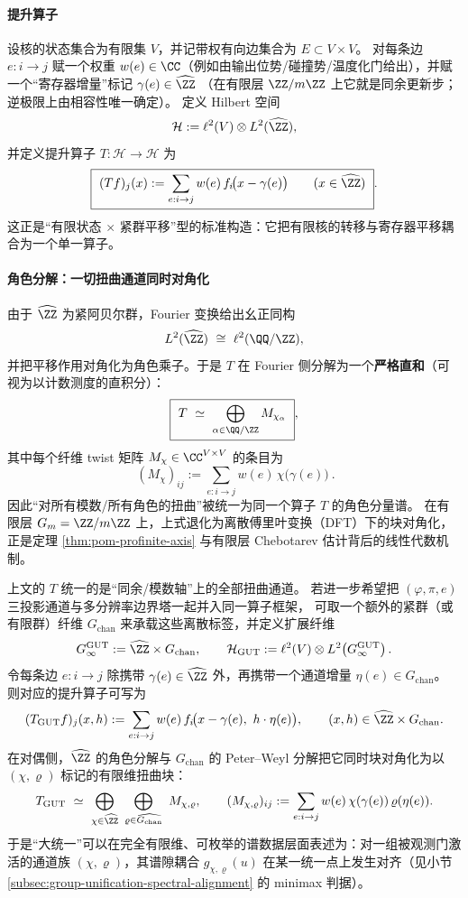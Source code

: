 \paragraph{提升算子}
设核的状态集合为有限集 \(V\)，并记带权有向边集合为 \(E\subset V\times V\)。
对每条边 \(e:i\to j\) 赋一个权重 \(w(e)\in\CC\)（例如由输出位势/碰撞势/温度化门给出），并赋一个“寄存器增量”标记
\(\gamma(e)\in \widehat{\ZZ}\)
（在有限层 \(\ZZ/m\ZZ\) 上它就是同余更新步；逆极限上由相容性唯一确定）。
定义 Hilbert 空间
\[
\mathcal{H}:=\ell^2(V)\otimes L^2(\widehat{\ZZ}),
\]
并定义提升算子 \(T:\mathcal{H}\to\mathcal{H}\) 为
\[
\boxed{\ (Tf)_j(x):=\sum_{e:i\to j} w(e)\,f_i\!\bigl(x-\gamma(e)\bigr)\qquad(x\in\widehat{\ZZ})\ }.
\]
这正是“有限状态 \(\times\) 紧群平移”型的标准构造：它把有限核的转移与寄存器平移耦合为一个单一算子。

\paragraph{角色分解：一切扭曲通道同时对角化}
由于 \(\widehat{\ZZ}\) 为紧阿贝尔群，Fourier 变换给出幺正同构
\[
L^2(\widehat{\ZZ})\ \cong\ \ell^2(\QQ/\ZZ),
\]
并把平移作用对角化为角色乘子。于是 \(T\) 在 Fourier 侧分解为一个\textbf{严格直和}（可视为以计数测度的直积分）：
\[
\boxed{\ T\ \simeq\ \bigoplus_{\alpha\in\QQ/\ZZ} M_{\chi_\alpha}\ },
\]
其中每个纤维 twist 矩阵 \(M_{\chi}\in\CC^{V\times V}\) 的条目为
\[
\boxed{\ (M_\chi)_{ij}:=\sum_{e:i\to j} w(e)\,\chi\!\bigl(\gamma(e)\bigr)\ }.
\]
因此“对所有模数/所有角色的扭曲”被统一为同一个算子 \(T\) 的角色分量谱。
在有限层 \(G_m=\ZZ/m\ZZ\) 上，上式退化为离散傅里叶变换（DFT）下的块对角化，正是定理 \ref{thm:pom-profinite-axis} 与有限层 Chebotarev 估计背后的线性代数机制。

\begin{remark}\label{rem:pom-grand-unified-lift}
上文的 \(T\) 统一的是“同余/模数轴”上的全部扭曲通道。
若进一步希望把 \((\varphi,\pi,e)\) 三投影通道与多分辨率边界塔一起并入同一算子框架，
可取一个额外的紧群（或有限群）纤维 \(G_{\mathrm{chan}}\) 来承载这些离散标签，并定义扩展纤维
\[
G_\infty^{\mathrm{GUT}}
:=\widehat{\ZZ}\times G_{\mathrm{chan}},
\qquad
\mathcal{H}_{\mathrm{GUT}}:=\ell^2(V)\otimes L^2\!\left(G_\infty^{\mathrm{GUT}}\right).
\]
令每条边 \(e:i\to j\) 除携带 \(\gamma(e)\in\widehat{\ZZ}\) 外，再携带一个通道增量 \(\eta(e)\in G_{\mathrm{chan}}\)。
则对应的提升算子可写为
\[
(T_{\mathrm{GUT}}f)_j(x,h)
:=\sum_{e:i\to j} w(e)\,f_i\!\bigl(x-\gamma(e),\ h\cdot \eta(e)\bigr),
\qquad (x,h)\in \widehat{\ZZ}\times G_{\mathrm{chan}}.
\]
在对偶侧，\(\widehat{\ZZ}\) 的角色分解与 \(G_{\mathrm{chan}}\) 的 Peter--Weyl 分解把它同时块对角化为以 \((\chi,\varrho)\) 标记的有限维扭曲块：
\[
T_{\mathrm{GUT}}\ \simeq\ \bigoplus_{\chi\in\widehat{\ZZ}}\ \bigoplus_{\varrho\in\widehat{G_{\mathrm{chan}}}}\ M_{\chi,\varrho},
\qquad
(M_{\chi,\varrho})_{ij}:=\sum_{e:i\to j} w(e)\,\chi(\gamma(e))\,\varrho(\eta(e)).
\]
于是“大统一”可以在完全有限维、可枚举的谱数据层面表述为：对一组被观测门激活的通道族 \((\chi,\varrho)\)，其谱隙耦合 \(g_{\chi,\varrho}(u)\) 在某一统一点上发生对齐（见小节 \ref{subsec:group-unification-spectral-alignment} 的 minimax 判据）。
\end{remark}

